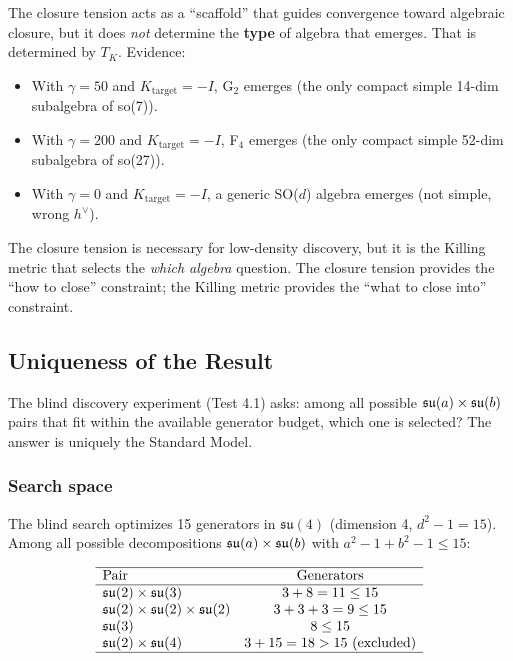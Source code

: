 The closure tension acts as a ``scaffold'' that guides convergence toward algebraic closure, but it does \textit{not} determine the \textbf{type} of algebra that emerges. That is determined by $T_K$. Evidence:

\begin{itemize}
\item With $\gamma = 50$ and $K_{\mathrm{target}} = -I$, G$_2$ emerges (the only compact simple 14-dim subalgebra of so(7)).
\item With $\gamma = 200$ and $K_{\mathrm{target}} = -I$, F$_4$ emerges (the only compact simple 52-dim subalgebra of so(27)).
\item With $\gamma = 0$ and $K_{\mathrm{target}} = -I$, a generic SO($d$) algebra emerges (not simple, wrong $h^\vee$).
\end{itemize}

The closure tension is necessary for low-density discovery, but it is the Killing metric that selects the \textit{which algebra} question. The closure tension provides the ``how to close'' constraint; the Killing metric provides the ``what to close into'' constraint.

\subsection{Uniqueness of the Result}\label{sec:uniqueness}

The blind discovery experiment (Test 4.1) asks: among all possible $\mathfrak{su}(a) \times \mathfrak{su}(b)$ pairs that fit within the available generator budget, which one is selected? The answer is uniquely the Standard Model.

\subsubsection{Search space}

The blind search optimizes 15 generators in $\mathfrak{su}(4)$ (dimension 4, $d^2 - 1 = 15$). Among all possible decompositions $\mathfrak{su}(a) \times \mathfrak{su}(b)$ with $a^2 - 1 + b^2 - 1 \leq 15$:

\begin{equation}
\begin{array}{lc}
\hline
\text{Pair} & \text{Generators} \\
\hline
\mathfrak{su}(2) \times \mathfrak{su}(3) & 3 + 8 = 11 \leq 15 \\
\mathfrak{su}(2) \times \mathfrak{su}(2) \times \mathfrak{su}(2) & 3 + 3 + 3 = 9 \leq 15 \\
\mathfrak{su}(3) & 8 \leq 15 \\
\mathfrak{su}(2) \times \mathfrak{su}(4) & 3 + 15 = 18 > 15 \text{ (excluded)} \\
\hline
\end{array}
\end{equation}

